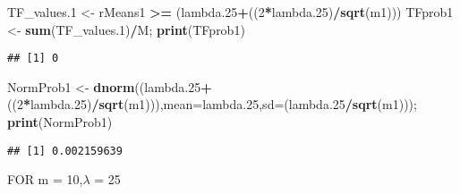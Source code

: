 \documentclass[
]{article}
\newenvironment{Shaded}{\begin{snugshade}}{\end{snugshade}}
\newcommand{\DataTypeTok}[1]{\textcolor[rgb]{0.13,0.29,0.53}{#1}}
\newcommand{\DecValTok}[1]{\textcolor[rgb]{0.00,0.00,0.81}{#1}}
\newcommand{\FloatTok}[1]{\textcolor[rgb]{0.00,0.00,0.81}{#1}}
\newcommand{\KeywordTok}[1]{\textcolor[rgb]{0.13,0.29,0.53}{\textbf{#1}}}
\newcommand{\NormalTok}[1]{#1}
\newcommand{\OperatorTok}[1]{\textcolor[rgb]{0.81,0.36,0.00}{\textbf{#1}}}
\newcommand{\StringTok}[1]{\textcolor[rgb]{0.31,0.60,0.02}{#1}}
\begin{document}
\begin{Shaded}
\begin{Highlighting}[]
\NormalTok{TF_values}\FloatTok{.1}\NormalTok{ <-}\StringTok{ }\NormalTok{rMeans1 }\OperatorTok{>=}\StringTok{ }\NormalTok{(lambda}\FloatTok{.25}\OperatorTok{+}\NormalTok{((}\DecValTok{2}\OperatorTok{*}\NormalTok{lambda}\FloatTok{.25}\NormalTok{)}\OperatorTok{/}\KeywordTok{sqrt}\NormalTok{(m1)))}
\NormalTok{TFprob1 <-}\StringTok{ }\KeywordTok{sum}\NormalTok{(TF_values}\FloatTok{.1}\NormalTok{)}\OperatorTok{/}\NormalTok{M; }\KeywordTok{print}\NormalTok{(TFprob1)}
\end{Highlighting}
\end{Shaded}

\begin{verbatim}
## [1] 0
\end{verbatim}

\begin{Shaded}
\begin{Highlighting}[]
\NormalTok{NormProb1 <-}\StringTok{ }\KeywordTok{dnorm}\NormalTok{((lambda}\FloatTok{.25}\OperatorTok{+}\NormalTok{((}\DecValTok{2}\OperatorTok{*}\NormalTok{lambda}\FloatTok{.25}\NormalTok{)}\OperatorTok{/}\KeywordTok{sqrt}\NormalTok{(m1))),}\DataTypeTok{mean=}\NormalTok{lambda}\FloatTok{.25}\NormalTok{,}\DataTypeTok{sd=}\NormalTok{(lambda}\FloatTok{.25}\OperatorTok{/}\KeywordTok{sqrt}\NormalTok{(m1))); }\KeywordTok{print}\NormalTok{(NormProb1)}
\end{Highlighting}
\end{Shaded}

\begin{verbatim}
## [1] 0.002159639
\end{verbatim}

FOR m = 10,\(\lambda\) = 25
\end{document}
